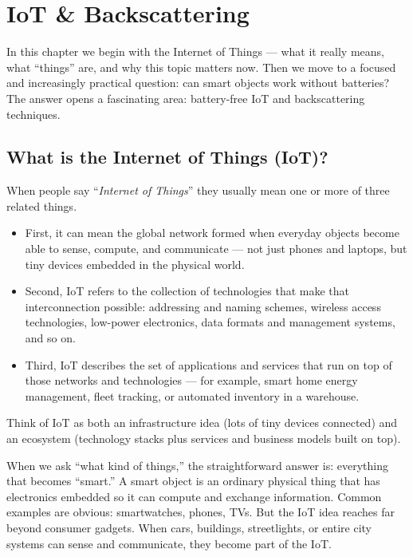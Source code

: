 \chapter{IoT \& Backscattering}
In this chapter we begin with the Internet of Things — what it really means, what “things” are, and why this topic matters now. 
Then we move to a focused and increasingly practical question: can smart objects work without batteries? The answer opens a fascinating area: battery-free IoT and backscattering techniques.

\section{What is the Internet of Things (IoT)?}
When people say “\textit{Internet of Things}” they usually mean one or more of three related things. 
\begin{itemize}
    \item First, it can mean the global network formed when everyday objects become able to sense, compute, and communicate — not just phones and laptops, but tiny devices embedded in the physical world. 
    \item Second, IoT refers to the collection of technologies that make that interconnection possible: addressing and naming schemes, wireless access technologies, low-power electronics, data formats and management systems, and so on. 
    \item Third, IoT describes the set of applications and services that run on top of those networks and technologies — for example, smart home energy management, fleet tracking, or automated inventory in a warehouse.
\end{itemize}
Think of IoT as both an infrastructure idea (lots of tiny devices connected) and an ecosystem (technology stacks plus services and business models built on top).

When we ask “what kind of things,” the straightforward answer is: everything that becomes “smart.” A smart object is an ordinary physical thing that has electronics embedded so it can compute and exchange information. Common examples are obvious: smartwatches, phones, TVs. But the IoT idea reaches far beyond consumer gadgets. When cars, buildings, streetlights, or entire city systems can sense and communicate, they become part of the IoT.

